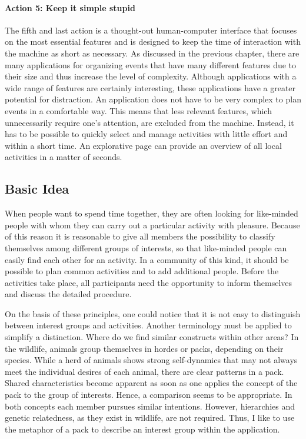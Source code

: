 \documentclass[12pt,numbers=noenddot,parskip,bibliography=totocnumbered,listof=totocnumbered]{scrreprt}
\begin{document}
\paragraph{Action 5: Keep it simple stupid}
The fifth and last action is a thought-out human-computer interface that focuses on the most essential features and is designed to keep the time of interaction with the machine as short as necessary. As discussed in the previous chapter, there are many applications for organizing events that have many different features due to their size and thus increase the level of complexity. Although applications with a wide range of features are certainly interesting, these applications have a greater potential for distraction. An application does not have to be very complex to plan events in a comfortable way. \newline
This means that less relevant features, which unnecessarily require one's attention, are excluded from the machine. Instead, it has to be possible to quickly select and manage activities with little effort and within a short time. An explorative page can provide an overview of all local activities in a matter of seconds.

\subsection{Basic Idea}
When people want to spend time together, they are often looking for like-minded people with whom they can carry out a particular activity with pleasure. Because of this reason it is reasonable to give all members the possibility to classify themselves among different groups of interests, so that like-minded people can easily find each other for an activity. In a community of this kind, it should be possible to plan common activities and to add additional people. Before the activities take place, all participants need the opportunity to inform themselves and discuss the detailed procedure. 

On the basis of these principles, one could notice that it is not easy to distinguish between interest groups and activities. Another terminology must be applied to simplify a distinction. Where do we find similar constructs within other areas? In the wildlife, animals group themselves in hordes or packs, depending on their species. While a herd of animals shows strong self-dynamics that may not always meet the individual desires of each animal, there are clear patterns in a pack. Shared characteristics become apparent as soon as one applies the concept of the pack to the group of interests. Hence, a comparison seems to be appropriate. In both concepts each member pursues similar intentions. However, hierarchies and genetic relatedness, as they exist in wildlife, are not required. Thus, I like to use the metaphor of a pack to describe an interest group within the application.
\end{document}

